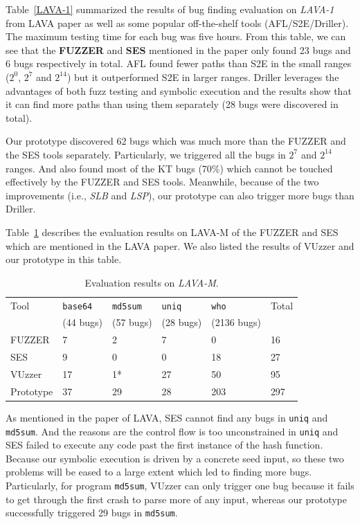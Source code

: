 Table~\ref{LAVA-1} summarized the results of bug finding evaluation on \textit{LAVA-1} from LAVA paper as well as some popular off-the-shelf tools (AFL/S2E/Driller). The maximum testing time for each bug was five hours. From this table, we can see that the \textbf{FUZZER} and \textbf{SES} mentioned in the paper only found 23 bugs and 6 bugs respectively in total. AFL found fewer paths than S2E in the small ranges ($2^0$, $2^7$ and $2^{14}$) but it outperformed S2E in larger ranges. Driller leverages the advantages of both fuzz testing and symbolic execution and the results show that it can find more paths than using them separately (28 bugs were discovered in total).

Our prototype discovered 62 bugs which was much more than the FUZZER and the SES tools separately. Particularly, we triggered all the bugs in $2^7$ and $2^{14}$ ranges. And also found most of the KT bugs (70\%) which cannot be touched effectively by the FUZZER and SES tools. Meanwhile, because of the two improvements (i.e., \textit{SLB} and \textit{LSP}), our prototype can also trigger more bugs than Driller.

Table~\ref{LAVA-M} describes the evaluation results on LAVA-M of the FUZZER and SES which are mentioned in the LAVA paper. We also listed the results of VUzzer and our prototype in this table. 

\begin{table}
  \caption{\label{LAVA-M}Evaluation results on \textit{LAVA-M}.}
  \centering
	\begin{tabular}{p{2cm}<{\centering} p{1.5cm}<{\centering} p{1.5cm}<{\centering}  p{1.5cm}<{\centering} p{1.8cm}<{\centering}  p{1.5cm}<{\centering} }
		\toprule
	    Tool & \texttt{base64} & \texttt{md5sum} & \texttt{uniq} & \texttt{who} & Total  \\
	         & (44 bugs) & (57 bugs) & (28 bugs) & (2136 bugs) &  \\
		\midrule
		FUZZER 		& 7  & 2  & 7    & 0   & 16  \\
		SES	        & 9  & 0  & 0    & 18  & 27  \\
		VUzzer		& 17 & 1* & 27   & 50  & 95 \\
		Prototype	& 37 & 29 & 28   & 203 & 297 \\
	 \bottomrule
	\end{tabular}
\end{table}

As mentioned in the paper of LAVA, SES cannot find any bugs in \texttt{uniq} and \texttt{md5sum}. And the reasons are the control flow is too unconstrained in \texttt{uniq} and SES failed to execute any code past the first instance of the hash function. Because our symbolic execution is driven by a concrete seed input, so these two problems will be eased to a large extent which led to finding more bugs. Particularly, for program \texttt{md5sum}, VUzzer can only trigger one bug because it fails to get through the first crash to parse more of any input, whereas our prototype successfully triggered 29 bugs in \texttt{md5sum}.

